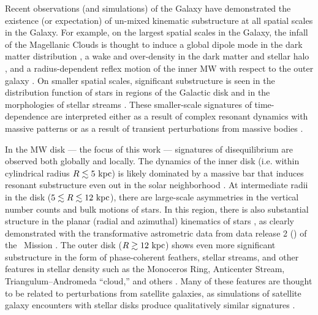 Recent observations (and simulations) of the Galaxy have demonstrated the existence (or
expectation) of un-mixed kinematic substructure at all spatial scales in the Galaxy.
For example, on the largest spatial scales in the Galaxy, the infall of the Magellanic
Clouds is thought to induce a global dipole mode in the dark matter distribution
\citep[e.g.,][]{Garavito-Camargo, blah}, a wake and over-density in the dark matter and
stellar halo \citep{Garavito-Camargo, Conroy}, and a radius-dependent reflex motion of
the inner MW with respect to the outer galaxy \citep{Garavito-Camargo, Petersen, Erkal}.
On smaller spatial scales, significant substructure is seen in the distribution function
of stars in regions of the Galactic disk \citep[e.g.,][]{hipparcos, dehnen, Trick} and
in the morphologies of stellar streams \citep{??, PWB2018, Li-AAU}.
These smaller-scale signatures of time-dependence are interpreted either as a result of
complex resonant dynamics with massive patterns \citep[e.g., spiral arms or the galactic
bar][]{Hunt-transient-spirals, D'onghia bar, Pearson-bar-streams} or as a result of
transient perturbations from massive bodies \citep[e.g., dark matter subhalos or
satellite galaxies][]{Bonaca:2019, ...}.

In the MW disk --- the focus of this work --- signatures of disequilibrium are observed
both globally and locally.
The dynamics of the inner disk (i.e. within cylindrical radius $R \lesssim 5~\mathrm{kpc}$) is
likely dominated by a massive bar \citep[e.g.,][]{Blitz, Wegg} that induces resonant
substructure even out in the solar neighborhood \citep{todo}.
At intermediate radii in the disk ($5 \lesssim R \lesssim 12~\mathrm{kpc}$), there are
large-scale asymmetries in the vertical number counts \citep{Widrow:2012, Williams:2013}
and bulk motions \citep{Carlin??} of stars.
In this region, there is also substantial structure in the planar (radial and azimuthal)
kinematics of stars \citep{Katz:XX}, as clearly demonstrated with the transformative
astrometric data from data release 2 () of the \gaia\ Mission
\citep{Gaia-dr2-papers}.
The outer disk ($R \gtrsim 12~\mathrm{kpc}$) shows even more significant substructure in the
form of phase-coherent feathers, stellar streams, and other features in stellar density
such as the Monoceros Ring, Anticenter Stream, Triangulum--Andromeda ``cloud,'' and
others \citep{Newberg, Slater, Price-Whelan, Xu, Li, Sheffield, Laporte}.
Many of these features are thought to be related to perturbations from satellite
galaxies, as simulations of satellite galaxy encounters with stellar disks produce
qualitatively similar signatures \citep[e.g.,][]{Old-paper, others, Laporte:2019}.

